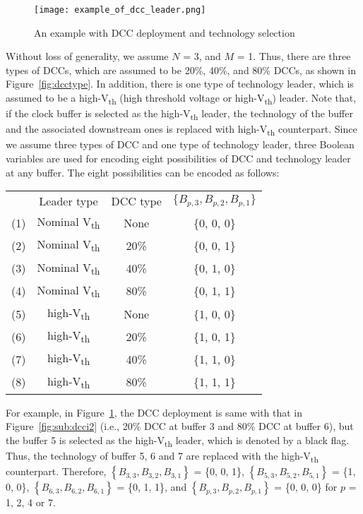 \begin{figure}
    \centering
    \texttt{[image: example\_of\_dcc\_leader.png]}
    \caption{An example with DCC deployment and technology selection}
    \label{fig:example_dcc_tva}
\end{figure}

Without loss of generality, we assume $N$ = 3, and $M$ = 1. Thus, there are three types of DCCs, which are assumed to be 20\%, 40\%, and 80\% DCCs, as shown in Figure~\ref{fig:dcctype}. In addition, there is one type of technology leader, which is assumed to be a high-V\textsubscript{th} (high threshold voltage or high-V\textsubscript{th}) leader. Note that, if the clock buffer is selected as the high-V\textsubscript{th} leader, the technology of the buffer and the associated downstream ones is replaced with high-V\textsubscript{th} counterpart. Since we assume three types of DCC and one type of technology leader, three Boolean variables are used for encoding eight possibilities of DCC and technology leader at any buffer. The eight possibilities can be encoded as follows:

{\small
\begin{tabular}{  c  c  c  c  }
  	 & Leader type & DCC type & $\{B_{p,3}, B_{p,2}, B_{p,1}\}$ \\ 
  	(1)\quad & Nominal V\textsubscript{th} & None & \{0, 0, 0\} \\ 
  	(2)\quad & Nominal V\textsubscript{th} &20\% &  \{0, 0, 1\} \\ 
  	(3)\quad & Nominal V\textsubscript{th} &40\% &  \{0, 1, 0\} \\ 
  	(4)\quad & Nominal V\textsubscript{th} &80\% &  \{0, 1, 1\} \\ 
	(5)\quad & high-V\textsubscript{th} & None & \{1, 0, 0\} \\ 
  	(6)\quad & high-V\textsubscript{th} & 20\% &  \{1, 0, 1\} \\ 
  	(7)\quad & high-V\textsubscript{th} & 40\% &  \{1, 1, 0\} \\ 
  	(8)\quad & high-V\textsubscript{th} & 80\% &  \{1, 1, 1\} \\ 
\end{tabular}}


For example, in Figure~\ref{fig:example_dcc_tva}, the DCC deployment is same with that in Figure~\ref{fig:sub:dcci2} (i.e., 20\% DCC at buffer 3 and 80\% DCC at buffer 6), but the buffer 5 is selected as the high-V\textsubscript{th} leader, which is denoted by a black flag. Thus, the technology of buffer 5, 6 and 7 are replaced with the high-V\textsubscript{th} counterpart. Therefore, {\small $\left\{B_{3,3}, B_{3,2}, B_{3,1}\right\}$ = \{0, 0, 1\}}, {\small $\left\{B_{5,3}, B_{5,2}, B_{5,1}\right\}$ = \{1, 0, 0\}}, {\small $\left\{B_{6,3}, B_{6,2}, B_{6,1}\right\}$ = \{0, 1, 1\}}, and {\small $\left\{B_{p,3}, B_{p,2}, B_{p,1}\right\}$ = \{0, 0, 0\}} for $p$ = 1, 2, 4 or 7.

